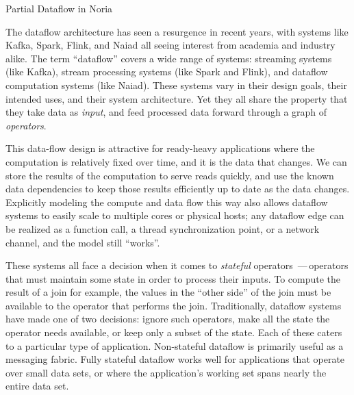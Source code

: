 \documentclass[fontsize=12pt,paper=letter]{scrartcl}
\begin{document}




\begin{center}
  \Large Partial Dataflow in Noria
\end{center}

\vspace{0.3in}
\noindent
The dataflow architecture has seen a resurgence in recent years, with systems
like Kafka\cite{kafka}, Spark\cite{spark,spark-streaming}, Flink\cite{flink}, and
Naiad\cite{naiad} all seeing interest from academia and industry alike. The term
``dataflow'' covers a wide range of systems: streaming systems (like Kafka),
stream processing systems (like Spark and Flink), and dataflow computation
systems (like Naiad). These systems vary in their design goals, their intended
uses, and their system architecture. Yet they all share the property that they
take data as \emph{input}, and feed processed data forward through a graph of
\emph{operators}.

This data-flow design is attractive for ready-heavy applications where the
computation is relatively fixed over time, and it is the data that changes.
We can store the results of the computation to serve reads quickly, and use the
known data dependencies to keep those results efficiently up to date as the data
changes. Explicitly modeling the compute and data flow this way also allows
dataflow systems to easily scale to multiple cores or physical hosts; any
dataflow edge can be realized as a function call, a thread synchronization
point, or a network channel, and the model still ``works''.

These systems all face a decision when it comes to \emph{stateful} operators\,
---\,operators that must maintain some state in order to process their inputs.
To compute the result of a join for example, the values in the ``other side'' of
the join must be available to the operator that performs the join.
Traditionally, dataflow systems have made one of two decisions: ignore such
operators, make all the state the operator needs available, or keep only a
subset of the state. Each of these caters to a particular type of application.
Non-stateful dataflow is primarily useful as a messaging fabric. Fully stateful
dataflow works well for applications that operate over small data sets, or where
the application's working set spans nearly the entire data set.
\end{document}
